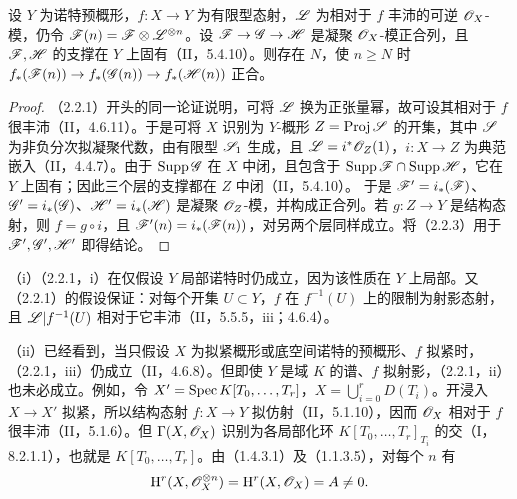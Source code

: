 设 $Y$ 为诺特预概形，$f:X\to Y$ 为有限型态射，$\mathscr L$ 为相对于 $f$ 丰沛的可逆 $\mathscr O_X$-模，仍令 $\mathscr F(n)=\mathscr F\otimes\mathscr L^{\otimes n}$。设 $\mathscr F\to\mathscr G\to\mathscr H$ 是凝聚 $\mathscr O_X$-模正合列，且 $\mathscr F,\mathscr H$ 的支撑在 $Y$ 上固有（II，5.4.10）。则存在 $N$，使 $n\geq N$ 时 $f_*(\mathscr F(n))\to f_*(\mathscr G(n))\to f_*(\mathscr H(n))$ 正合。
\begin{proof}
（2.2.1）开头的同一论证说明，可将 $\mathscr L$ 换为正张量幂，故可设其相对于 $f$ 很丰沛（II，4.6.11）。于是可将 $X$ 识别为 $Y$-概形 $Z=\operatorname{Proj}\mathscr S$ 的开集，其中 $\mathscr S$ 为非负分次拟凝聚代数，由有限型 $\mathscr S_1$ 生成，且 $\mathscr L=i^*\mathscr O_Z(1)$，$i:X\to Z$ 为典范嵌入（II，4.4.7）。由于 $\operatorname{Supp}\mathscr G$ 在 $X$ 中闭，且包含于 $\operatorname{Supp}\mathscr F\cap\operatorname{Supp}\mathscr H$，它在 $Y$ 上固有；因此三个层的支撑都在 $Z$ 中闭（II，5.4.10）。
于是 $\mathscr F'=i_*(\mathscr F)$、$\mathscr G'=i_*(\mathscr G)$、$\mathscr H'=i_*(\mathscr H)$ 是凝聚 $\mathscr O_Z$-模，并构成正合列。若 $g:Z\to Y$ 是结构态射，则 $f=g\circ i$，且 $\mathscr F'(n)=i_*(\mathscr F(n))$，对另两个层同样成立。将（2.2.3）用于 $\mathscr F',\mathscr G',\mathscr H'$ 即得结论。
\end{proof}

（i）（2.2.1，i）在仅假设 $Y$ 局部诺特时仍成立，因为该性质在 $Y$ 上局部。又（2.2.1）的假设保证：对每个开集 $U\subset Y$，$f$ 在 $f^{-1}(U)$ 上的限制为射影态射，且 $\mathscr L|f^{-1}(U)$ 相对于它丰沛（II，5.5.5，iii；4.6.4）。

（ii）已经看到，当只假设 $X$ 为拟紧概形或底空间诺特的预概形、$f$ 拟紧时，（2.2.1，iii）仍成立（II，4.6.8）。但即使 $Y$ 是域 $K$ 的谱、$f$ 拟射影，（2.2.1，ii）也未必成立。例如，令 $X'=\operatorname{Spec} K[T_0,\ldots,T_r]$，$X=\bigcup_{i=0}^rD(T_i)$。开浸入 $X\to X'$ 拟紧，所以结构态射 $f:X\to Y$ 拟仿射（II，5.1.10），因而 $\mathscr O_X$ 相对于 $f$ 很丰沛（II，5.1.6）。但 $\Gamma(X,\mathscr O_X)$ 识别为各局部化环 $K[T_0,\ldots,T_r]_{T_i}$ 的交（I，8.2.1.1），也就是 $K[T_0,\ldots,T_r]$。由（1.4.3.1）及（1.1.3.5），对每个 $n$ 有
\[
\mathrm H^r(X,\mathscr O_X^{\otimes n})=\mathrm H^r(X,\mathscr O_X)=A\ne0.
\]

